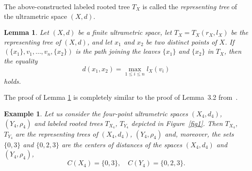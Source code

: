 \documentclass[pdflatex,sn-mathphys-num]{sn-jnl}%
\theoremstyle{thmstyleone}%
\newtheorem{Lemma}[Theorem]{Lemma}
\theoremstyle{thmstyletwo}%
\newtheorem{Example}[Theorem]{Example}
\theoremstyle{thmstylethree}%
\theoremstyle{thmstyletwo}%
\theoremstyle{thmstylethree}%
\begin{document}
The above-constructed labeled rooted tree $T_X$ is called the \textit{representing tree}
of the ultrametric space $(X,d)$.


\begin{Lemma}\label{swrgh}
Let $(X,d)$ be a finite ultrametric space, let $T_X=T_X(r_X,l_X)$ be the representing tree of $(X,d)$, and let $x_1$ and $x_2$ be two distinct points of $X$.
If $(\{x_1\}, v_1, \ldots, v_n, \{x_2\})$ is the path joining the leaves $\{x_1\}$ and $\{x_2\}$ in $T_X$, then the equality
\begin{equation}\label{sant}
d(x_1,x_2)=\max_{1\le i\le n} l_X(v_i)
\end{equation}
holds.
\end{Lemma}


The proof of Lemma \ref{swrgh} is completely similar to the proof of Lemma~3.2 from~\cite{PD2014JMS}. 
























\begin{Example}\label{kar92}
Let us consider the four-point ultrametric spaces $(X_4,d_4)$, $(Y_4,\rho_4)$ and labeled rooted trees $T_{X_4}$, $T_{Y_4}$ depicted in Figure~\ref{fig1}. Then $T_{X_4}$, $T_{Y_4}$ are the representing trees of $(X_4,d_4)$, $(Y_4,\rho_4)$ and, moreover, the sets $\{0,3\}$ and $\{0,2,3\}$ are the centers of distances of the spaces 
$(X_4,d_4)$ and $(Y_4, \rho_4)$,
\begin{equation*}
    C(X_4)=\{0,3\}, \quad C(Y_4)=\{0,2,3\}.
\end{equation*}
\end{Example}
\end{document}
